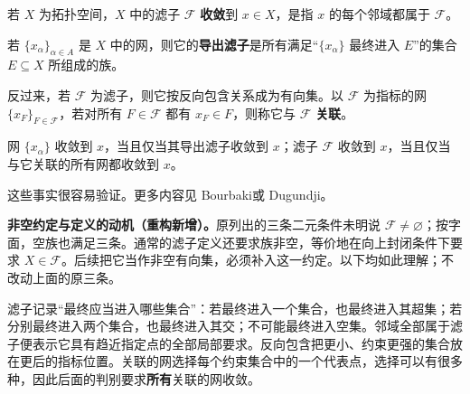 \documentclass[../../main.tex]{subfiles}
\begin{document}
\begin{definition}[滤子的收敛]\label{definition:ch04-filter-convergence}
若 $X$ 为拓扑空间，$X$ 中的滤子 $\mathcal F$ \textbf{收敛}到 $x\in X$，是指 $x$ 的每个邻域都属于 $\mathcal F$。
\end{definition}
\begin{definition}[导出滤子与关联的网]\label{definition:ch04-derived-filter-associated-net}
若 $\{x_\alpha\}_{\alpha\in A}$ 是 $X$ 中的网，则它的\textbf{导出滤子}是所有满足“$\{x_\alpha\}$ 最终进入 $E$”的集合 $E\subseteq X$ 所组成的族。

反过来，若 $\mathcal F$ 为滤子，则它按反向包含关系成为有向集。以 $\mathcal F$ 为指标的网 $\{x_F\}_{F\in\mathcal F}$，若对所有 $F\in\mathcal F$ 都有 $x_F\in F$，则称它与 $\mathcal F$ \textbf{关联}。
\end{definition}
\begin{proposition}\label{proposition:ch04-net-filter-equivalence}
网 $\{x_\alpha\}$ 收敛到 $x$，当且仅当其导出滤子收敛到 $x$；滤子 $\mathcal F$ 收敛到 $x$，当且仅当与它关联的所有网都收敛到 $x$。
\end{proposition}
这些事实很容易验证。更多内容见 Bourbaki\cite{folland-bib-020}或 Dugundji\cite{folland-bib-034}。
\begin{remark}
\textbf{非空约定与定义的动机（重构新增）。}原列出的三条二元条件未明说 $\mathcal F\ne\varnothing$；按字面，空族也满足三条。通常的滤子定义还要求族非空，等价地在向上封闭条件下要求 $X\in\mathcal F$。后续把它当作非空有向集，必须补入这一约定。以下均如此理解；不改动上面的原三条。

滤子记录“最终应当进入哪些集合”：若最终进入一个集合，也最终进入其超集；若分别最终进入两个集合，也最终进入其交；不可能最终进入空集。邻域全部属于滤子便表示它具有趋近指定点的全部局部要求。反向包含把更小、约束更强的集合放在更后的指标位置。关联的网选择每个约束集合中的一个代表点，选择可以有很多种，因此后面的判别要求\textbf{所有}关联的网收敛。
\end{remark}
\end{document}
